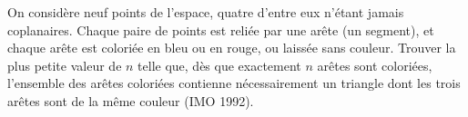 On considère neuf points de l'espace, quatre d'entre eux n'étant jamais coplanaires. Chaque paire de points est reliée par une arête (un segment), et chaque arête est coloriée en bleu ou en rouge, ou laissée sans couleur. Trouver la plus petite valeur de $n$ telle que, dès que exactement $n$ arêtes sont coloriées, l'ensemble des arêtes coloriées contienne nécessairement un triangle dont les trois arêtes sont de la même couleur (IMO 1992).
